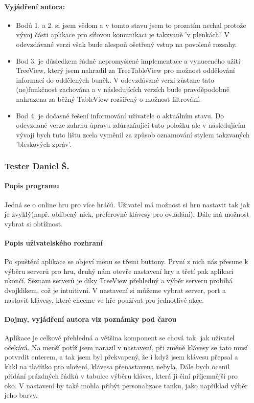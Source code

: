 \documentclass[12pt,a4paper]{article}
\begin{document}
\paragraph{Vyjádření autora: }
\begin{itemize}
\item Bodů 1. a 2. si jsem vědom a v tomto stavu jsem to prozatím nechal protože vývoj části aplikace pro síťovou komunikaci je takzvaně 'v plenkách'. V odevzdávané verzi však bude alespoň ošetřený vstup na povolené rozsahy.
\item Bod 3. je důsledkem řádně nepromyšlené implementace a vynuceného užití TreeView, který jsem nahradil za TreeTableView pro možnost oddělování informací do oddělených buněk. V odevzdávané verzi zůstane tato (ne)funkčnost zachována a v následujících verzích bude pravděpodobně nahrazena za běžný TableView rozšířený o možnost filtrování.
\item Bod 4. je dočasné řešení informování uživatele o aktuálním stavu. Do odevzdané verze zahrnu úpravu zdůrazňující tuto položku ale v následujícím vývoji bych tuto lištu zcela vyměnil za způsob oznamování stylem takzvaných 'bleskových zpráv'.
\end{itemize}

\newpage
\subsubsection{Tester Daniel Š.}
\paragraph{Popis programu\\}
Jedná se o online hru pro více hráčů. Uživatel má možnost si hru nastavit tak jak je zvyklý(např. oblíbený nick, preferovné klávesy pro ovládání). Dále má
možnost vybrat si obtížnost.
\paragraph{Popis uživatelského rozhraní\\}
Po spuštění aplikace se objeví menu se třemi buttony. První z nich nás přesune k výběru serverů pro hru, druhý nám otevře nastavení hry a třetí pak aplikaci ukončí. Seznam serverů je díky TreeView přehledný a výběr serveru probíhá dvojklikem, což je intuitivní. V nastavení si můžeme vybrat server, port a nastavit klávesy, které chceme ve hře používat pro jednotlivé akce.
\paragraph{Dojmy, vyjádření autora viz poznámky pod čarou\\}
Aplikace je celkově přehledná a většina komponent se chová tak, jak uživatel očekává. Na menší potíž jsem narazil v nastavení, při změně klávesy se tato musí potvrdit enterem, a tak jsem byl překvapený, že i když jsem klávesu přepsal a klikl na tlačítko pro uložení, klávesa přenastavena nebyla\footnotemark[1]. Dále bych ocenil přidání prázdných řádků v tabulce výběru kláves, která ji činí příjemnější pro oko\footnotemark[2]. V nastavení by také mohla přibýt personalizace tanku, jako například výběr jeho
barvy\footnotemark[3].
\end{document}
